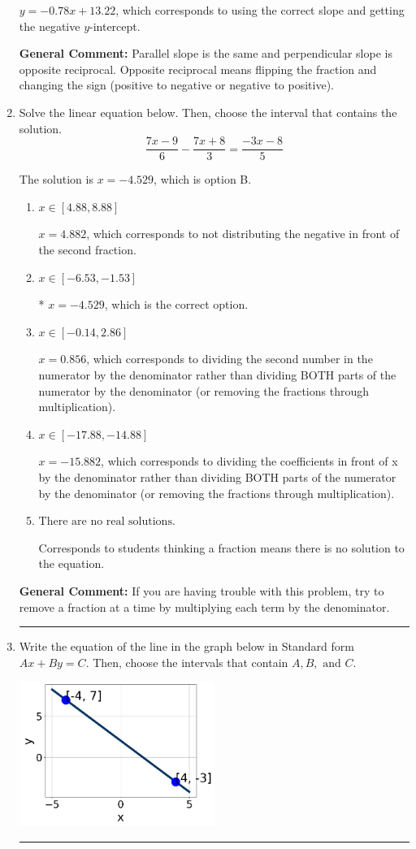 \documentclass{extbook}[14pt]
\newcommand{\litem}[1]{\item #1

\rule{\textwidth}{0.4pt}}
\begin{document}
\begin{enumerate}
{\begin{enumerate}[label=\Alph*.]
 $y = -0.78x + 13.22$, which corresponds to using the correct slope and getting the negative $y$-intercept.
\end{enumerate}

\textbf{General Comment:} Parallel slope is the same and perpendicular slope is opposite reciprocal. Opposite reciprocal means flipping the fraction and changing the sign (positive to negative or negative to positive).
}
\litem{
Solve the linear equation below. Then, choose the interval that contains the solution.
\[ \frac{7x -9}{6} - \frac{7x + 8}{3} = \frac{-3x -8}{5} \]

The solution is \( x = -4.529 \), which is option B.\begin{enumerate}[label=\Alph*.]
\item \( x \in [4.88, 8.88] \)

 $x = 4.882$, which corresponds to not distributing the negative in front of the second fraction.
\item \( x \in [-6.53, -1.53] \)

* $x = -4.529$, which is the correct option.
\item \( x \in [-0.14, 2.86] \)

 $x = 0.856$, which corresponds to dividing the second number in the numerator by the denominator rather than dividing BOTH parts of the numerator by the denominator (or removing the fractions through multiplication).
\item \( x \in [-17.88, -14.88] \)

 $x = -15.882$, which corresponds to dividing the coefficients in front of x by the denominator rather than dividing BOTH parts of the numerator by the denominator (or removing the fractions through multiplication).
\item \( \text{There are no real solutions.} \)

Corresponds to students thinking a fraction means there is no solution to the equation.
\end{enumerate}

\textbf{General Comment:} If you are having trouble with this problem, try to remove a fraction at a time by multiplying each term by the denominator.
}
\litem{
Write the equation of the line in the graph below in Standard form $Ax+By=C$. Then, choose the intervals that contain $A, B, \text{ and } C$.

\begin{center}
    \includegraphics[width=0.5\textwidth]{../Figures/linearGraphToStandardCopyB.png}
\end{center}




}
\end{enumerate}
\end{document}
